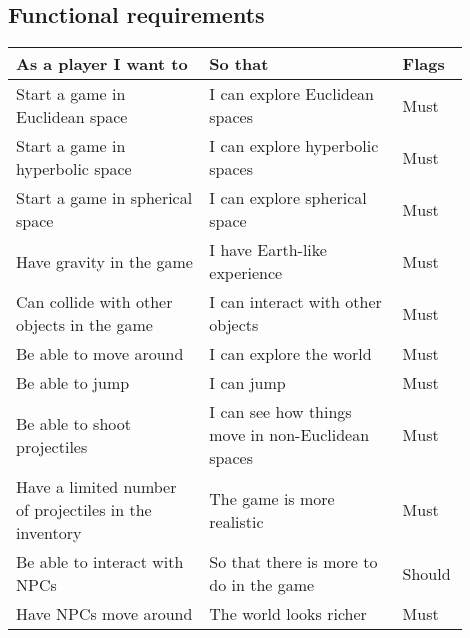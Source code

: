 \subsection{Functional requirements}

\begin{table}[H]
    \begin{tabular}{p{0.4\linewidth}|p{0.4\linewidth}|p{0.1\linewidth}}
        \hline
        \textbf{As a player I want to}                             & \textbf{So that}                                                   & \textbf{Flags} \\ \hline
        Start a game in Euclidean space                            & I can explore Euclidean spaces                                     & Must           \\
        Start a game in hyperbolic space                           & I can explore hyperbolic spaces                                    & Must           \\
        Start a game in spherical space                            & I can explore spherical space                                      & Must           \\
        Have gravity in the game                                   & I have Earth-like experience                                       & Must           \\
        Can collide with other objects in the game                 & I can interact with other objects                                  & Must           \\
        Be able to move around                                     & I can explore the world                                            & Must           \\
        Be able to jump                                            & I can jump                                                         & Must           \\
        Be able to shoot projectiles                               & I can see how things move in non-Euclidean spaces                  & Must           \\
        Have a limited number of projectiles in the inventory      & The game is more realistic                                         & Must           \\
        Be able to interact with NPCs                              & So that there is more to do in the game                            & Should         \\
        Have NPCs move around                                      & The world looks richer                                             & Must           \\

\end{tabular}
\end{table}
